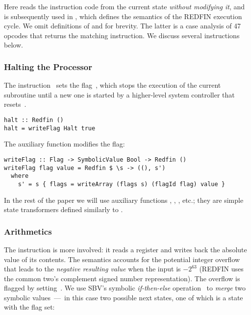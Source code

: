 \noindent
Here  reads the instruction code from the current
state \emph{without modifying it}, and is subsequently used in ,
which defines the semantics of the REDFIN execution cycle. We omit definitions of
 and  for brevity. The latter is a
case analysis of 47 opcodes that returns the matching instruction. We discuss
several instructions below.

\subsubsection{Halting the Processor}
The instruction~ sets the flag~, which stops the execution of
the current subroutine until a new one is started by a higher-level system
controller that resets~.

\vspace{1mm}
\begin{verbatim}
halt :: Redfin ()
halt = writeFlag Halt true
\end{verbatim}
\vspace{1mm}

\noindent
The auxiliary function  modifies the flag:

\vspace{1mm}
\begin{verbatim}
writeFlag :: Flag -> SymbolicValue Bool -> Redfin ()
writeFlag flag value = Redfin $ \s -> ((), s')
  where
    s' = s { flags = writeArray (flags s) (flagId flag) value }
\end{verbatim}
\vspace{1mm}

\noindent
In the rest of the paper we will use auxiliary functions ,
, , etc.; they are simple state transformers
defined similarly to .

\subsubsection{Arithmetics}
The instruction  is more involved:
it reads a register and writes back the absolute value of its contents.
The semantics accounts for the potential integer overflow that leads to the
\emph{negative resulting value} when the input is $-2^{63}$ (REDFIN uses the
common two's complement signed number representation). The overflow is flagged
by setting~. We use SBV's symbolic \emph{if-then-else}
operation~ to \emph{merge} two symbolic values~---~in this case two
possible next states, one of which is a state with the  flag set:

